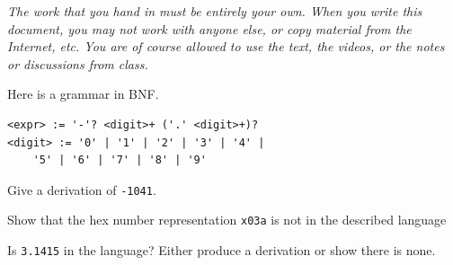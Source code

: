 \documentclass[answers, nolegalese]{examjh}
\begin{document}
\thispagestyle{empty}
\vspace*{1ex}
\begin{center}
 \parbox{0.95\textwidth}{\textit{
  The work that you hand in must be entirely your own. 
  When you write this document, you may not work with anyone else,
  or copy material from the Internet, etc.
  You are of course allowed to use the text, the videos, or the notes
  or discussions from class.
  }}
\end{center}
\vspace*{1ex}
\begin{questions}
\question
Here is a grammar in BNF.
\begin{lstlisting}[basicstyle=\small\tt,columns=fullflexible]
<expr> := '-'? <digit>+ ('.' <digit>+)?
<digit> := '0' | '1' | '2' | '3' | '4' |
    '5' | '6' | '7' | '8' | '9'
\end{lstlisting}
\begin{parts}
\item
Give a derivation of \texttt{-1041}.
\item
Show that the hex number representation \texttt{x03a} is not in the
described language
\item
Is \texttt{3.1415} in the language?
Either produce a derivation or show there is none.
\end{parts}


\end{questions}
\end{document}
